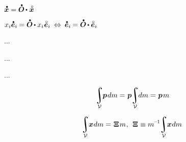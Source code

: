 ${\mathdotabove{\bm{x}} = \mathdotabove{\rotationtensor} \hspace{-0.15ex} \dotp \hspace{.1ex} \mathcircabove{\bm{x}}}$

${x_i \mathdotabove{\bm{e}}_i \hspace{-0.12ex} = \mathdotabove{\rotationtensor} \hspace{-0.15ex} \dotp x_i \hspace{.1ex} \mathcircabove{\bm{e}}_i
\:\Leftrightarrow\:
\mathdotabove{\bm{e}}_i \hspace{-0.12ex} = \mathdotabove{\rotationtensor} \hspace{-0.15ex} \dotp \mathcircabove{\bm{e}}_i}$

...

    

...

...

\hspace{-0.4ex}\begin{equation*}
\displaystyle\integral_{\mathcal{V}} \hspace{-0.6ex} \positionofthepole \hspace{.2ex} dm
= \hspace{.1ex} \positionofthepole \hspace{-0.5ex} \displaystyle\integral_{\mathcal{V}} \hspace{-0.6ex} dm
= \hspace{.1ex} \positionofthepole \hspace{.2ex} m
\end{equation*}

\begin{equation*}
\hspace{-0.4ex} \displaystyle\integral_{\mathcal{V}} \hspace{-0.6ex} \bm{x} \hspace{.1ex} dm = \hspace{.15ex} \bm{\Xi} \hspace{.2ex} m
\hspace{.1ex} , \:\:
\bm{\Xi} \hspace{.1ex} \equiv m^{\hspace{-0.1ex}\expminusone} \hspace{-0.5ex} \displaystyle\integral_{\mathcal{V}} \hspace{-0.6ex} \bm{x} \hspace{.1ex} dm
\end{equation*}

